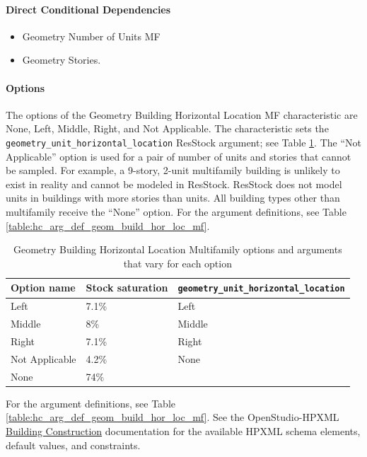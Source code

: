 \paragraph{Direct Conditional Dependencies}
\begin{itemize}
    \item Geometry Number of Units MF
    \item Geometry Stories.
\end{itemize}

\paragraph{Options}
The options of the Geometry Building Horizontal Location MF characteristic are None, Left, Middle, Right, and Not Applicable. The characteristic sets the \texttt{geometry\_unit\_horizontal\_location} ResStock argument; see Table \ref{table:hc_opt_geom_build_hor_loc_mf}. The ``Not Applicable'' option is used for a pair of number of units and stories that cannot be sampled. For example, a 9-story, 2-unit multifamily building is unlikely to exist in reality and cannot be modeled in ResStock. ResStock does not model units in buildings with more stories than units. All building types other than multifamily receive the ``None'' option. For the argument definitions, see Table \ref{table:hc_arg_def_geom_build_hor_loc_mf}. 


\begin{longtable}[]{ |p{}|p{4cm}| p{4cm}|}
\caption{Geometry Building Horizontal Location Multifamily options and arguments that vary for each option} \label{table:hc_opt_geom_build_hor_loc_mf}  \\
\toprule\noalign{}
Option name  & Stock saturation & \texttt{geometry\_unit\_horizontal\_location} \\
\midrule\noalign{}
\endhead
\bottomrule\noalign{}
\endlastfoot
Left & 7.1\% & Left \\ \hline
Middle & 8\% & Middle \\ \hline
Right & 7.1\% & Right \\ \hline
Not Applicable & 4.2\% & None \\ \hline
None & 74\% & \\
\end{longtable}

For the argument definitions, see Table \ref{table:hc_arg_def_geom_build_hor_loc_mf}. See the OpenStudio-HPXML \href{https://openstudio-hpxml.readthedocs.io/en/v1.8.1/workflow_inputs.html#hpxml-building-construction}{Building Construction} documentation for the available HPXML schema elements, default values, and constraints.

